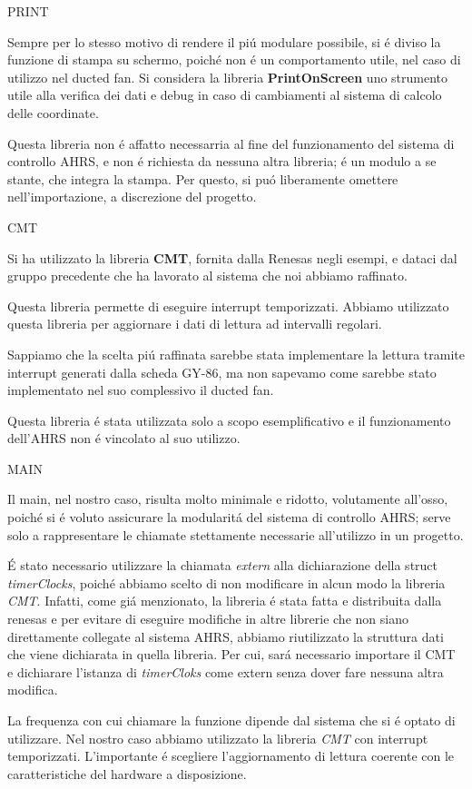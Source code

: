 PRINT

Sempre per lo stesso motivo di rendere il piú modulare possibile, si é diviso la funzione di stampa su schermo, poiché non é un comportamento utile, nel caso di utilizzo nel ducted fan.
Si considera la libreria \textbf{PrintOnScreen} uno strumento utile alla verifica dei dati e debug in caso di cambiamenti al sistema di calcolo delle coordinate.

Questa libreria non é affatto necessarria al fine del funzionamento del sistema di controllo AHRS, e non é richiesta da nessuna altra libreria; é un modulo a se stante, che integra la stampa.
Per questo, si puó liberamente omettere nell’importazione, a discrezione del progetto.

CMT

Si ha utilizzato la libreria \textbf{CMT}, fornita dalla Renesas negli esempi, e dataci dal gruppo precedente che ha lavorato al sistema che noi abbiamo raffinato.

Questa libreria permette di eseguire interrupt temporizzati.
Abbiamo utilizzato questa libreria per aggiornare i dati di lettura ad intervalli regolari.

Sappiamo che la scelta piú raffinata sarebbe stata implementare la lettura tramite interrupt generati dalla scheda GY-86, ma non sapevamo come sarebbe stato implementato nel suo complessivo il ducted fan.

Questa libreria é stata utilizzata solo a scopo esemplificativo e il funzionamento dell’AHRS non é vincolato al suo utilizzo.

MAIN

Il main, nel nostro caso, risulta molto minimale e ridotto, volutamente all’osso, poiché si é voluto assicurare la modularitá del sistema di controllo AHRS; serve solo a rappresentare le chiamate stettamente necessarie all’utilizzo in un progetto.

É stato necessario utilizzare la chiamata \emph{extern} alla dichiarazione della struct \emph{timerClocks}, poiché abbiamo scelto di non modificare in alcun modo la libreria \emph{CMT}.
Infatti, come giá menzionato, la libreria é stata fatta e distribuita dalla renesas e per evitare di eseguire modifiche in altre librerie che non siano direttamente collegate al sistema AHRS, abbiamo riutilizzato la struttura dati che viene dichiarata in quella libreria.
Per cui, sará necessario importare il CMT e dichiarare l’istanza di \emph{timerCloks} come extern senza dover fare nessuna altra modifica.

La frequenza con cui chiamare la funzione dipende dal sistema che si é optato di utilizzare.
Nel nostro caso abbiamo utilizzato la libreria \emph{CMT} con interrupt temporizzati.
L’importante é scegliere l’aggiornamento di lettura coerente con le caratteristiche del hardware a disposizione.

